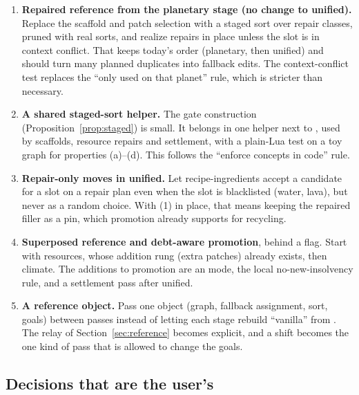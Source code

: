 \begin{enumerate}
\item \textbf{Repaired reference from the planetary stage (no change to unified).} Replace the scaffold and patch selection with a staged sort over repair classes, pruned with real sorts, and realize repairs in place unless the slot is in context conflict. That keeps today's order (planetary, then unified) and should turn many planned duplicates into fallback edits. The context-conflict test replaces the ``only used on that planet'' rule, which is stricter than necessary.
\item \textbf{A shared staged-sort helper.} The gate construction (Proposition~\ref{prop:staged}) is small. It belongs in one helper next to , used by scaffolds, resource repairs and settlement, with a plain-Lua test on a toy graph for properties (a)--(d). This follows the ``enforce concepts in code'' rule.
\item \textbf{Repair-only moves in unified.} Let recipe-ingredients accept a candidate for a slot on a repair plan even when the slot is blacklisted (water, lava), but never as a random choice. With (1) in place, that means keeping the repaired filler as a pin, which promotion already supports for recycling.
\item \textbf{Superposed reference and debt-aware promotion}, behind a flag. Start with resources, whose addition rung (extra patches) already exists, then climate. The additions to promotion are an  mode, the local no-new-insolvency rule, and a settlement pass after unified.
\item \textbf{A reference object.} Pass one object (graph, fallback assignment, sort, goals) between passes instead of letting each stage rebuild ``vanilla'' from . The relay of Section~\ref{sec:reference} becomes explicit, and a shift becomes the one kind of pass that is allowed to change the goals.
\end{enumerate}

\subsection{Decisions that are the user's}

